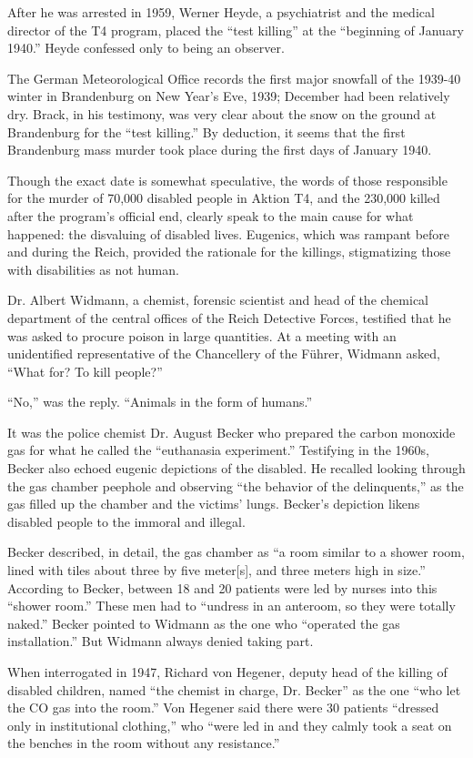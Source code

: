 After he was arrested in 1959, Werner Heyde, a psychiatrist and the
medical director of the T4 program, placed the ``test killing'' at the
``beginning of January 1940.'' Heyde confessed only to being an
observer.

The German Meteorological Office records the first major snowfall of the
1939-40 winter in Brandenburg on New Year's Eve, 1939; December had been
relatively dry. Brack, in his testimony, was very clear about the snow
on the ground at Brandenburg for the ``test killing.'' By deduction, it
seems that the first Brandenburg mass murder took place during the first
days of January 1940.

Though the exact date is somewhat speculative, the words of those
responsible for the murder of 70,000 disabled people in Aktion T4, and
the 230,000 killed after the program's official end, clearly speak to
the main cause for what happened: the disvaluing of disabled lives.
Eugenics, which was rampant before and during the Reich, provided the
rationale for the killings, stigmatizing those with disabilities as not
human.

Dr. Albert Widmann, a chemist, forensic scientist and head of the
chemical department of the central offices of the Reich Detective
Forces, testified that he was asked to procure poison in large
quantities. At a meeting with an unidentified representative of the
Chancellery of the Führer, Widmann asked, ``What for? To kill people?''

``No,'' was the reply. ``Animals in the form of humans.''

It was the police chemist Dr. August Becker who prepared the carbon
monoxide gas for what he called the ``euthanasia experiment.''
Testifying in the 1960s, Becker also echoed eugenic depictions of the
disabled. He recalled looking through the gas chamber peephole and
observing ``the behavior of the delinquents,'' as the gas filled up the
chamber and the victims' lungs. Becker's depiction likens disabled
people to the immoral and illegal.

Becker described, in detail, the gas chamber as ``a room similar to a
shower room, lined with tiles about three by five meter{[}s{]}, and
three meters high in size.'' According to Becker, between 18 and 20
patients were led by nurses into this ``shower room.'' These men had to
``undress in an anteroom, so they were totally naked.'' Becker pointed
to Widmann as the one who ``operated the gas installation.'' But Widmann
always denied taking part.

When interrogated in 1947, Richard von Hegener, deputy head of the
killing of disabled children, named ``the chemist in charge, Dr.
Becker'' as the one ``who let the CO gas into the room.'' Von Hegener
said there were 30 patients ``dressed only in institutional clothing,''
who ``were led in and they calmly took a seat on the benches in the room
without any resistance.''

